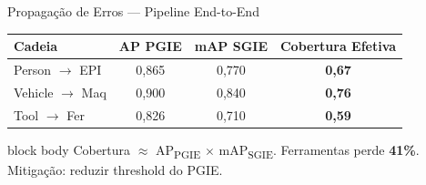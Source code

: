\begin{frame}{Propagação de Erros --- Pipeline End-to-End}
  \vspace{-2mm}
  \begin{center}
    \resizebox{0.85\textwidth}{!}{}
  \end{center}

  \begin{center}
    \scriptsize
    \renewcommand{\arraystretch}{1.05}
    \begin{tabular}{@{}lccc@{}}
      \toprule
      \textbf{Cadeia} & \textbf{AP PGIE} & \textbf{mAP SGIE} & \textbf{Cobertura Efetiva} \\
      \midrule
      \rowcolor{headcolor!10}
      Person $\to$ EPI & 0,865 & 0,770 & \textcolor{headcolor}{\textbf{0,67}} \\
      \rowcolor{headcolor!10}
      Vehicle $\to$ Maq & 0,900 & 0,840 & \textcolor{detectioncolor}{\textbf{0,76}} \\
      \rowcolor{skipcolor!8}
      Tool $\to$ Fer & 0,826 & 0,710 & \textcolor{skipcolor}{\textbf{0,59}} \\
      \bottomrule
    \end{tabular}
  \end{center}

  \begin{beamercolorbox}[wd=\textwidth, rounded=true, shadow=false]{block body}
    \centering
    {\scriptsize\color{stagecolor}%
      Cobertura $\approx$ AP\textsubscript{PGIE} $\times$ mAP\textsubscript{SGIE}.
      Ferramentas perde \textbf{41\%}. Mitigação: reduzir threshold do PGIE.}
  \end{beamercolorbox}
\end{frame}

